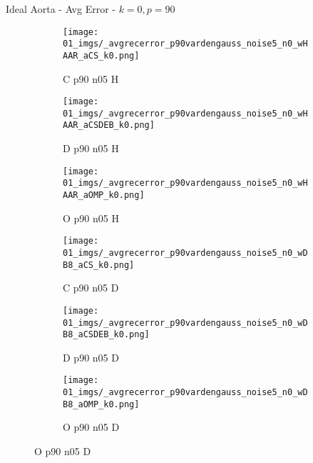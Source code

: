 \begin{frame}{Ideal Aorta - Avg Error - $k=0,p=90$}{}
\begin{figure}
\begin{subfigure}{0.13\textwidth}
\texttt{[image: 01\_imgs/\_avgrecerror\_p90vardengauss\_noise5\_n0\_wHAAR\_aCS\_k0.png]}
\caption*{\tiny C p90 n05 H}
\end{subfigure}
\begin{subfigure}{0.13\textwidth}
\texttt{[image: 01\_imgs/\_avgrecerror\_p90vardengauss\_noise5\_n0\_wHAAR\_aCSDEB\_k0.png]}
\caption*{\tiny D p90 n05 H}
\end{subfigure}
\begin{subfigure}{0.13\textwidth}
\texttt{[image: 01\_imgs/\_avgrecerror\_p90vardengauss\_noise5\_n0\_wHAAR\_aOMP\_k0.png]}
\caption*{\tiny O p90 n05 H}
\end{subfigure}
\begin{subfigure}{0.13\textwidth}
\texttt{[image: 01\_imgs/\_avgrecerror\_p90vardengauss\_noise5\_n0\_wDB8\_aCS\_k0.png]}
\caption*{\tiny C p90 n05 D}
\end{subfigure}
\begin{subfigure}{0.13\textwidth}
\texttt{[image: 01\_imgs/\_avgrecerror\_p90vardengauss\_noise5\_n0\_wDB8\_aCSDEB\_k0.png]}
\caption*{\tiny D p90 n05 D}
\end{subfigure}
\begin{subfigure}{0.13\textwidth}
\texttt{[image: 01\_imgs/\_avgrecerror\_p90vardengauss\_noise5\_n0\_wDB8\_aOMP\_k0.png]}
\caption*{\tiny O p90 n05 D}
\end{subfigure}

\vspace{5pt}


\end{figure}
\end{frame}
